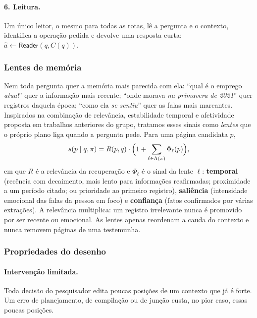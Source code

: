 \documentclass[11pt]{article}
\newcommand{\op}[1]{\textsf{#1}}
\begin{document}
\paragraph{6. Leitura.} Um único leitor, o mesmo para todas as rotas, lê a
pergunta e o contexto, identifica a operação pedida e devolve uma resposta
curta: $\hat a\leftarrow\op{Reader}(q, C(q))$.

\subsubsection{Lentes de memória}

Nem toda pergunta quer a memória mais parecida com ela: ``qual é o emprego
\emph{atual}'' quer a informação mais recente; ``onde morava \emph{na primavera
de 2021}'' quer registros daquela época; ``como ela \emph{se sentiu}'' quer as
falas mais marcantes. Inspirados na combinação de relevância, estabilidade
temporal e afetividade proposta em trabalhos anteriores do grupo, tratamos
esses sinais como \emph{lentes} que o próprio plano liga quando a pergunta
pede. Para uma página candidata $p$,
\begin{equation}
s(p\mid q,\pi)=R(p,q)\cdot\Bigl(1+\sum_{\ell\in\Lambda(\pi)}\Phi_\ell(p)\Bigr),
\label{eq:lens}
\end{equation}
em que $R$ é a relevância da recuperação e $\Phi_\ell$ é o sinal da lente
$\ell$: \textbf{temporal} (recência com decaimento, mais lento para
informações reafirmadas; proximidade a um período citado; ou prioridade ao
primeiro registro), \textbf{saliência} (intensidade emocional das falas da
pessoa em foco) e \textbf{confiança} (fatos confirmados por várias
extrações). A relevância multiplica: um registro irrelevante nunca é promovido
por ser recente ou emocional. As lentes apenas reordenam a cauda do contexto
e nunca removem páginas de uma testemunha.

\subsubsection{Propriedades do desenho}

\paragraph{Intervenção limitada.} Toda decisão do pesquisador edita poucas
posições de um contexto que já é forte. Um erro de planejamento, de
compilação ou de junção custa, no pior caso, essas poucas posições.
\end{document}
